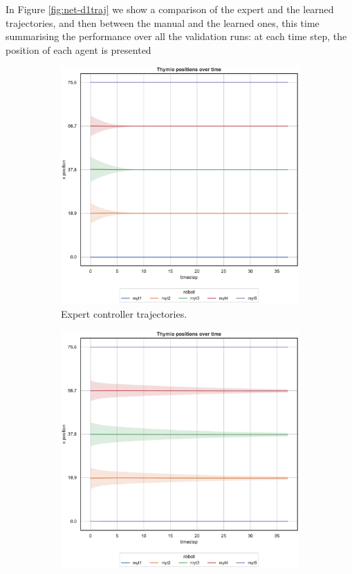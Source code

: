 In Figure \ref{fig:net-d1traj} we show a comparison of the expert and the learned 
trajectories, and then between the manual and the learned ones, this time 
summarising the performance over all the validation runs: at each time step, the 
position of each agent is presented 
\begin{figure}[!htb]
	\begin{center}
		\begin{subfigure}[h]{0.49\textwidth}
			\centering
			\includegraphics[width=.9\textwidth]{contents/images/net-d1/position-overtime-omniscient}%
			\caption{Expert controller trajectories.}
		\end{subfigure}
		\hfill
		\begin{subfigure}[h]{0.49\textwidth}
			\centering
			\includegraphics[width=.9\textwidth]{contents/images/net-d1/position-overtime-learned_distributed}

\end{subfigure}
\end{center}
\end{figure}
